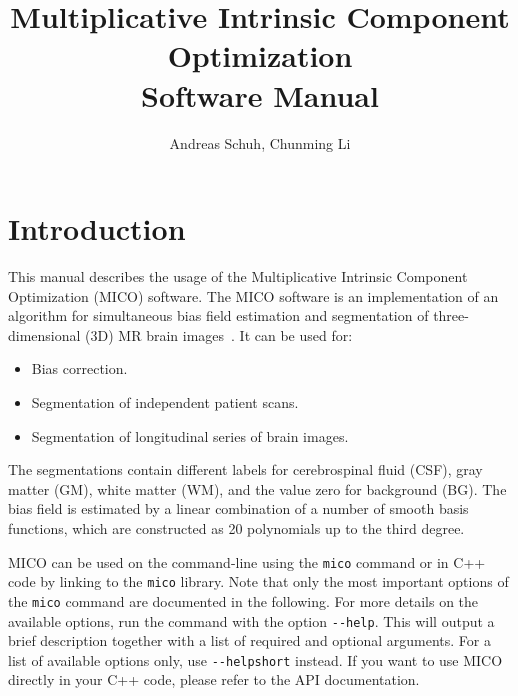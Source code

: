 \documentclass[a4paper,12pt]{article}
\title{Multiplicative Intrinsic Component Optimization \\ Software Manual}
\author{Andreas Schuh, Chunming Li}
\begin{document}
\maketitle
\tableofcontents
\setcounter{tocdepth}{1}

\pagebreak

\section{Introduction}
\label{intro}

This manual describes the usage of the Multiplicative Intrinsic Component\linebreak
Optimization (MICO) software. The MICO software is an implementation
of an algorithm for simultaneous bias field estimation and segmentation of
three-dimensional (3D) MR brain images~\cite{li,cvpr}. It can be used for:
\begin{itemize}
\item Bias correction.
\item Segmentation of independent patient scans.
\item Segmentation of longitudinal series of brain images.
\end{itemize}

The segmentations contain different labels for cerebrospinal fluid (CSF), \linebreak
gray matter (GM), white matter (WM), and the value zero for background (BG).
The bias field is estimated by a linear combination of a number of smooth basis
functions, which are constructed as 20 polynomials up to the third degree.

MICO can be used on the command-line using the \texttt{mico} command
or in C++ code by linking to the \texttt{mico} library. Note that only the most
important options of the \texttt{mico} command are documented in the following.
For more details on the available options, run the command with the option
\texttt{-{-}help}. This will output a brief description together with a list
of required and optional arguments. For a list of available options only,
use \texttt{-{-}helpshort} instead. If you want to use MICO directly in your
C++ code, please refer to the API documentation.

\end{document}
